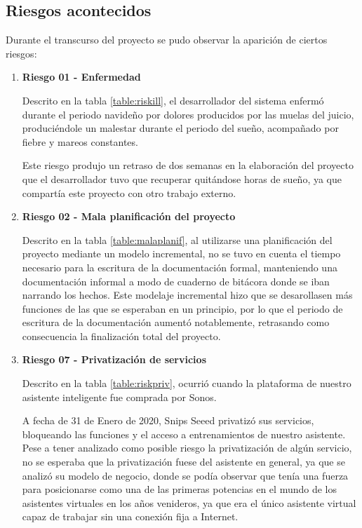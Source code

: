 \newpage
    \subsection{Riesgos acontecidos}
    
        Durante el transcurso del proyecto se pudo observar la aparición de ciertos riesgos:
        
        \begin{enumerate}
        
        \item \textbf{Riesgo 01 - Enfermedad}
        
        Descrito en la tabla \ref{table:riskill}, el desarrollador del sistema enfermó durante el periodo navideño por dolores producidos por las muelas del juicio, produciéndole un malestar durante el periodo del sueño, acompañado por fiebre y mareos constantes.
        
        Este riesgo produjo un retraso de dos semanas en la elaboración del proyecto que el desarrollador tuvo que recuperar quitándose horas de sueño, ya que compartía este proyecto con otro trabajo externo.
        
        \item \textbf{Riesgo 02 - Mala planificación del proyecto}
        
        Descrito en la tabla \ref{table:malaplanif}, al utilizarse una planificación del proyecto mediante un modelo incremental, no se tuvo en cuenta el tiempo necesario para la escritura de la documentación formal, manteniendo una documentación informal a modo de cuaderno de bitácora donde se iban narrando los hechos.
        Este modelaje incremental hizo que se desarollasen más funciones de las que se esperaban en un principio, por lo que el periodo de escritura de la documentación aumentó notablemente, retrasando como consecuencia la finalización total del proyecto.
        
            \item \textbf{Riesgo 07 - Privatización de servicios}
            
        Descrito en la tabla \ref{table:riskpriv}, ocurrió cuando la plataforma de nuestro asistente inteligente fue comprada por Sonos. 
        
        A fecha de 31 de Enero de 2020, Snips Seeed privatizó sus servicios, bloqueando las funciones y el acceso a entrenamientos de nuestro asistente. Pese a tener analizado como posible riesgo la privatización de algún servicio, no se esperaba que la privatización fuese del asistente en general, ya que se analizó su modelo de negocio, donde se podía observar que tenía una fuerza para posicionarse como una de las primeras potencias en el mundo de los asistentes virtuales en los años venideros, ya que era el único asistente virtual capaz de trabajar sin una conexión fija a Internet. 
        

\end{enumerate}
